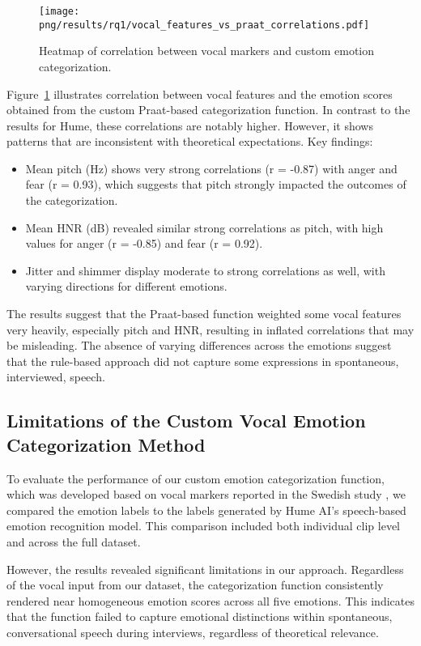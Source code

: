 \begin{figure}[H]
    \centering
    \texttt{[image: png/results/rq1/vocal\_features\_vs\_praat\_correlations.pdf]}
    \caption{Heatmap of correlation between vocal markers and custom emotion categorization.}
    \label{fig:heatmap-voc-praat}
\end{figure}
Figure~\ref{fig:heatmap-voc-praat} illustrates correlation between vocal features and the emotion scores obtained from the custom Praat-based categorization function. In contrast to the results for Hume, these correlations are notably higher. However, it shows patterns that are inconsistent with theoretical expectations. 
\medskip
Key findings: 
\begin{itemize}
    \item Mean pitch (Hz) shows very strong correlations (r = -0.87) with anger and fear (r = 0.93), which suggests that pitch strongly impacted the outcomes of the categorization. 
    \item Mean HNR (dB) revealed similar strong correlations as pitch, with high values for anger (r = -0.85) and fear (r = 0.92). 
    \item Jitter and shimmer display moderate to strong correlations as well, with varying directions for different emotions. 
\end{itemize}
The results suggest that the Praat-based function weighted some vocal features very heavily, especially pitch and HNR, resulting in inflated correlations that may be misleading. The absence of varying differences across the emotions suggest that the rule-based approach did not capture some expressions in spontaneous, interviewed, speech. 

\subsection{Limitations of the Custom Vocal Emotion Categorization Method}
To evaluate the performance of our custom emotion categorization function, which was developed based on vocal markers reported in the Swedish study \autocite{Ekberg2023}, we compared the emotion labels to the labels generated by Hume AI’s speech-based emotion recognition model. This comparison included both individual clip level and across the full dataset. 

However, the results revealed significant limitations in our approach. Regardless of the vocal input from our dataset, the categorization function consistently rendered near homogeneous emotion scores across all five emotions. This indicates that the function failed to capture emotional distinctions within spontaneous, conversational speech during interviews, regardless of theoretical relevance. 

